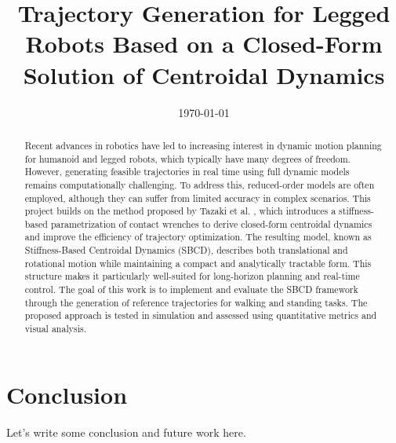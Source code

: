 \documentclass[12pt,a4paper,oneside]{article}
\title{Trajectory Generation for Legged Robots Based on a  Closed-Form Solution of Centroidal Dynamics}	                                    %
\date{\today}									    %
\theoremstyle{definition}
\theoremstyle{remark} %
\begin{document}

\newpage
\tableofcontents
\newpage
\begin{abstract}
\begin{sloppypar}
\noindent
Recent advances in robotics have led to increasing interest in dynamic motion planning for humanoid and legged robots, which typically have many degrees of freedom. However, generating feasible trajectories in real time using full dynamic models remains computationally challenging. To address this, reduced-order models are often employed, although they can suffer from limited accuracy in complex scenarios. This project builds on the method proposed by Tazaki et al. \cite{tazaki2024trajectory}, which introduces a stiffness-based parametrization of contact wrenches to derive closed-form centroidal dynamics and improve the efficiency of trajectory optimization. The resulting model, known as Stiffness-Based Centroidal Dynamics (SBCD), describes both translational and rotational motion while maintaining a compact and analytically tractable form. This structure makes it particularly well-suited for long-horizon planning and real-time control. The goal of this work is to implement and evaluate the SBCD framework through the generation of reference trajectories for walking and standing tasks. The proposed approach is tested in simulation and assessed using quantitative metrics and visual analysis.
\end{sloppypar}
\end{abstract}
\newpage

\clearpage

\clearpage

\clearpage

\clearpage

\clearpage

\section{Conclusion}
\label{sec:conclusion}
Let's write some conclusion and future work here. 
\clearpage



\end{document}
